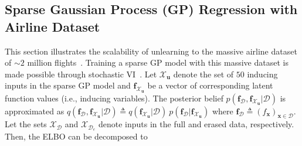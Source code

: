 \documentclass{article}
\theoremstyle{definition}
\newcommand{\mbf}[1]{\mathbf{#1}}
\newcommand{\mcl}[1]{\mathcal{#1}}
\newcommand{\dr}{\mcl{D}_e}
\begin{document}
\subsection{Sparse Gaussian Process (GP) Regression with Airline Dataset}%
\label{subsec:airline}
%
This section illustrates the scalability of unlearning to the massive airline dataset of $\sim 2$ million flights~\cite{hensman2013gaussian}. 
Training a sparse GP model with this massive dataset is made possible through stochastic VI~\cite{hensman2013gaussian}. 
Let $\mcl{X}_\mbf{u}$ denote the set of $50$ inducing inputs in the sparse GP model and $\mbf{f}_{\mcl{X}_\mbf{u}}$ be a vector of corresponding latent function values (i.e., inducing variables). The posterior belief $p(\mbf{f}_{\mcl{D}},\mbf{f}_{\mcl{X}_\mbf{u}}|\mcl{D})$ is approximated as $q(\mbf{f}_{\mcl{D}},\mbf{f}_{\mcl{X}_\mbf{u}}|\mcl{D}) \triangleq q(\mbf{f}_{\mcl{X}_\mbf{u}}|\mcl{D})\ p(\mbf{f}_{\mcl{D}}| \mbf{f}_{\mcl{X}_\mbf{u}})$ where $\mbf{f}_{\mcl{D}} \triangleq (f_{\mbf{x}})_{\mbf{x} \in \mcl{D}}$.
Let the sets $\mcl{X}_{\mcl{D}}$ and $\mcl{X}_{\dr}$ denote inputs in the full and erased data, respectively.
Then, the ELBO can be decomposed to
%
\end{document}
